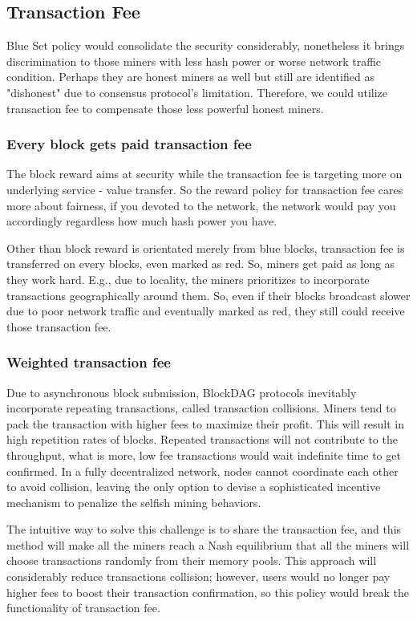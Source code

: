 \documentclass[a4paper,11pt]{article}
\begin{document}
\subsection{Transaction Fee}
Blue Set policy would consolidate the security considerably, nonetheless it brings discrimination to those miners with less hash power or worse network traffic condition. Perhaps they are honest miners as well but still are identified as "dishonest" due to consensus protocol's limitation. Therefore, we could utilize transaction fee to compensate those less powerful honest miners. 

\subsubsection{Every block gets paid transaction fee}
The block reward aims at security while the transaction fee is targeting more on underlying service - value transfer. So the reward policy for transaction fee cares more about fairness, if you devoted to the network, the network would pay you accordingly regardless how much hash power you have.

Other than block reward is orientated merely from  blue blocks, transaction fee is transferred on every blocks, even marked as red. So, miners get paid as long as they work hard. E.g., due to locality, the miners prioritizes to incorporate transactions geographically around them. So, even if their blocks broadcast slower due to poor network traffic and eventually marked as red, they still could receive those transaction fee.

\subsubsection{Weighted transaction fee}
Due to asynchronous block submission, BlockDAG protocols inevitably incorporate repeating transactions, called transaction collisions.
Miners tend to pack the transaction with higher fees to maximize their profit. This will result in high repetition rates of blocks. Repeated transactions will not contribute to the throughput, what is more, low fee transactions would wait indefinite time to get confirmed. In a fully decentralized network, nodes cannot coordinate each other to avoid collision, leaving the only option to devise a sophisticated incentive mechanism to penalize the selfish mining behaviors.

The intuitive way to solve this challenge is to share the transaction fee, and this method will make all the miners reach a Nash equilibrium that all the miners will choose transactions randomly from their memory pools. This approach will considerably reduce transactions collision; however, users would no longer pay higher fees to boost their transaction confirmation, so this policy would break the functionality of transaction fee.
\end{document}
